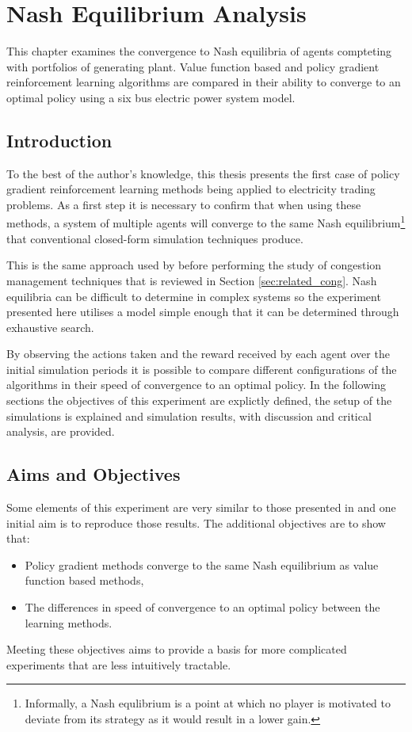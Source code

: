 \chapter{Nash Equilibrium Analysis}
\label{ch:nashanalysis}
This chapter examines the convergence to Nash
equilibria of agents compteting with portfolios of generating plant.  Value
function based and policy gradient reinforcement learning algorithms are
compared in their ability to converge to an optimal policy using a six bus
electric power system model.

\section{Introduction}
To the best of the author's knowledge, this thesis presents the first case of
policy gradient reinforcement learning methods being applied to electricity
trading problems.  As a first step it is necessary to confirm that when using
these methods, a system of multiple agents will converge to the same Nash
equilibrium\footnote{Informally, a Nash equlibrium is a point at which no
player is motivated to deviate from its strategy as it would result in a lower
gain.} that conventional closed-form simulation techniques produce.

This is the same approach used by  before performing the
study of congestion management techniques that is reviewed in Section
\ref{sec:related_cong}.  Nash equilibria can be difficult
to determine in complex systems so the experiment presented here utilises a
model simple enough that it can be determined through exhaustive search.

By observing the actions taken and the reward received by each agent over the
initial simulation periods it is possible to compare different configurations
of the algorithms in their speed of convergence to an optimal policy.  In the
following sections the objectives of this experiment are explictly defined, the
setup of the simulations is explained and simulation results, with discussion
and critical analysis, are provided.

\section{Aims and Objectives}
Some elements of this experiment are very similar to those presented in
 and one initial aim is to reproduce those results.
The additional objectives are to show that:
\begin{itemize}
  \item Policy gradient methods converge to the same Nash equilibrium as value
  function based methods,
  \item The differences in speed of convergence to an optimal policy between
  the learning methods.
\end{itemize}
Meeting these objectives aims to provide a basis for more complicated
experiments that are less intuitively tractable.

